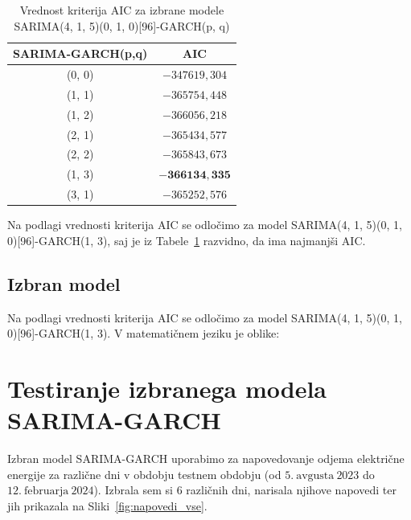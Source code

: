 \documentclass[a4paper, 11pt]{article}
\begin{document}
\begin{table}[!ht]
    \centering
    \caption{Vrednost kriterija AIC za izbrane modele SARIMA(4, 1, 5)(0, 1, 0)[96]-GARCH(p, q)}\par\medskip
    \label{Tab:GARCH_AIC}
    \begin{tabular}{c|c}
        SARIMA-GARCH(p,q) & AIC \\ \hline
        (0, 0) & $-347619{,}304$ \\ 
        (1, 1) & $-365754{,}448$ \\ 
        (1, 2) & $-366056{,}218$ \\ 
        (2, 1) & $-365434{,}577$ \\ 
        (2, 2) & $-365843{,}673$ \\ 
        (1, 3) & $\mathbf{-366134{,}335}$ \\ 
        (3, 1) & $-365252{,}576$ \\ 
    \end{tabular}
\end{table}

\noindent Na podlagi vrednosti kriterija AIC se odločimo za model SARIMA(4, 1, 5)(0, 1, 0)[96]-GARCH(1, 3), saj
je iz Tabele~\ref{Tab:GARCH_AIC} razvidno, da ima najmanjši AIC. 


\subsection{Izbran model}

Na podlagi vrednosti kriterija AIC se odločimo za model SARIMA(4, 1, 5)(0, 1, 0)[96]-GARCH(1, 3). 
V matematičnem jeziku je oblike:



\pagebreak

\section{Testiranje izbranega modela SARIMA-GARCH}

Izbran model SARIMA-GARCH uporabimo za napovedovanje odjema električne energije za različne dni v obdobju testnem obdobju
(od $5.~\text{avgusta}~2023$ do $12.~\text{februarja}~2024$). Izbrala sem si $6$ različnih dni, narisala njihove napovedi ter
jih prikazala na Sliki~\ref{fig:napovedi_vse}.
\end{document}
